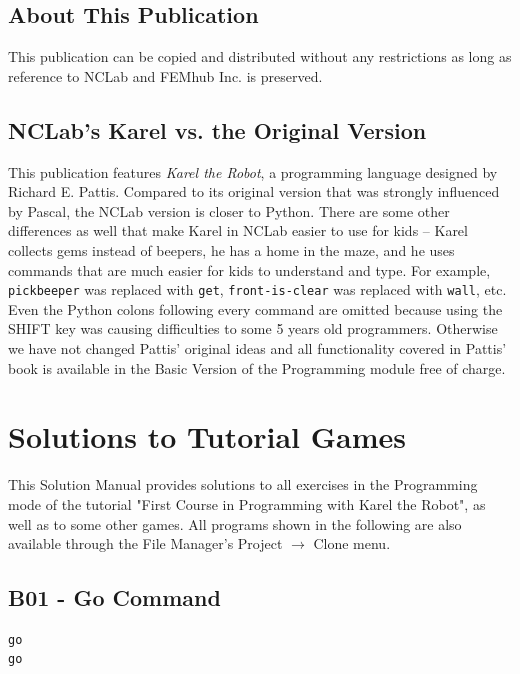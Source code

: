 \documentclass[article,A4,12pt]{llncs}
\begin{document}
\subsection*{About This Publication}
This publication can be copied and distributed without any restrictions
as long as reference to NCLab and FEMhub Inc. is preserved.

\subsection*{NCLab's Karel vs. the Original Version}
This publication features {\em Karel the Robot}, a programming language 
designed by Richard E. Pattis. Compared to its original version that was
strongly influenced by Pascal, the NCLab version is closer to Python.
There are some other differences as well that make Karel in NCLab easier to use 
for kids -- Karel collects gems instead of beepers, he has a home in the 
maze, and he uses commands that are much easier for kids to understand
and type. For example, {\tt pickbeeper} was replaced with {\tt get}, 
{\tt front-is-clear} was replaced with {\tt wall}, etc. Even the Python 
colons following every command are omitted because using the SHIFT key 
was causing difficulties to some 5 years old programmers. 
Otherwise we have not changed Pattis' original ideas and all functionality 
covered in Pattis' book is available in the Basic Version of the Programming
module free of charge. 

\normalsize

\newpage
\setcounter{tocdepth}{2}
\tableofcontents

\newpage

\pagestyle{plain}
\setcounter{page}{1}


\section{Solutions to Tutorial Games}

This Solution Manual provides solutions to all exercises in the 
Programming mode of the tutorial "First Course in Programming with
Karel the Robot", as well as to some other games. All programs shown 
in the following are also available through the File Manager's Project 
$\rightarrow$ Clone menu.


\subsection{B01 - Go Command}
\begin{verbatim}
go
go
\end{verbatim}
\end{document}
